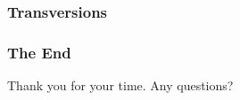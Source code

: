 \documentclass{beamer}
\begin{document}
\begin{frame}
\frametitle{Transversions}
\end{frame}

\begin{frame}
\frametitle{The End}
Thank you for your time.
Any questions?
\end{frame}


\end{document}
